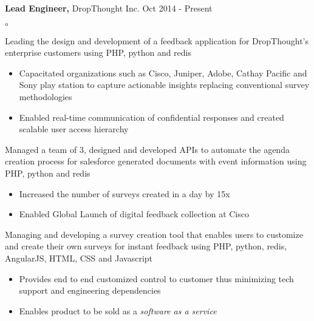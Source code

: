 \textbf{Lead Engineer,} DropThought Inc. \hfill Oct 2014 - Present \\  
   \begin{list} {$\circ$}{} %
 \item Leading the design and development of a feedback application for DropThought's enterprise customers using PHP, python and redis\itemsep -2pt
   \begin{itemize}[label=]
     \item \itemsep -8pt%
   Capacitated organizations such as Cisco, Juniper, Adobe, Cathay Pacific and Sony play station to capture actionable insights replacing conventional survey methodologies\\
     \item \itemsep -8pt%
   Enabled real-time communication of confidential responses and created scalable user access hierarchy\\
  \end{itemize}       
\item Managed a team of 3, designed and developed APIs to automate the agenda creation process for salesforce generated documents with event information using PHP, python and redis\itemsep -2pt
   \begin{itemize}[label=]
     \item  \itemsep -8pt%
     Increased the number of surveys created in a day by 15x \\
     \item  \itemsep -8pt%
     Enabled Global Launch of digital feedback collection at Cisco\\
    \end{itemize}
\item Managing and developing a survey creation tool that enables users to customize and create their own surveys for instant feedback using PHP, python, redis, AngularJS, HTML, CSS and Javascript\itemsep -2pt
   \begin{itemize}[label=]
     \item \itemsep -8pt%
     Provides end to end customized control to customer thus minimizing tech support and engineering dependencies \\
     \item  \itemsep -8pt%
     Enables product to be sold as a \sl{software as a service}\\
    \end{itemize}             
\end{list}
     
